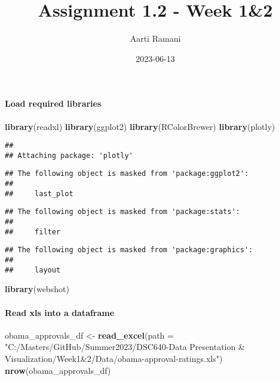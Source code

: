 \documentclass[
]{article}
\title{Assignment 1.2 - Week 1\&2}
\author{Aarti Ramani}
\date{2023-06-13}
\newenvironment{Shaded}{\begin{snugshade}}{\end{snugshade}}
\newcommand{\AttributeTok}[1]{\textcolor[rgb]{0.13,0.29,0.53}{#1}}
\newcommand{\FunctionTok}[1]{\textcolor[rgb]{0.13,0.29,0.53}{\textbf{#1}}}
\newcommand{\NormalTok}[1]{#1}
\newcommand{\OtherTok}[1]{\textcolor[rgb]{0.56,0.35,0.01}{#1}}
\newcommand{\StringTok}[1]{\textcolor[rgb]{0.31,0.60,0.02}{#1}}
\begin{document}
\maketitle

\hypertarget{load-required-libraries}{%
\paragraph{Load required libraries}\label{load-required-libraries}}

\begin{Shaded}
\begin{Highlighting}[]
\FunctionTok{library}\NormalTok{(readxl)}
\FunctionTok{library}\NormalTok{(ggplot2)}
\FunctionTok{library}\NormalTok{(RColorBrewer)   }
\FunctionTok{library}\NormalTok{(plotly)}
\end{Highlighting}
\end{Shaded}

\begin{verbatim}
## 
## Attaching package: 'plotly'
\end{verbatim}

\begin{verbatim}
## The following object is masked from 'package:ggplot2':
## 
##     last_plot
\end{verbatim}

\begin{verbatim}
## The following object is masked from 'package:stats':
## 
##     filter
\end{verbatim}

\begin{verbatim}
## The following object is masked from 'package:graphics':
## 
##     layout
\end{verbatim}

\begin{Shaded}
\begin{Highlighting}[]
\FunctionTok{library}\NormalTok{(webshot)}
\end{Highlighting}
\end{Shaded}

\hypertarget{read-xls-into-a-dataframe}{%
\paragraph{Read xls into a dataframe}\label{read-xls-into-a-dataframe}}

\begin{Shaded}
\begin{Highlighting}[]
\NormalTok{obama\_approvals\_df }\OtherTok{\textless{}{-}} \FunctionTok{read\_excel}\NormalTok{(}\AttributeTok{path =} \StringTok{"C:/Masters/GitHub/Summer2023/DSC640{-}Data Presentation \& Visualization/Week1\&2/Data/obama{-}approval{-}ratings.xls"}\NormalTok{)}
\FunctionTok{nrow}\NormalTok{(obama\_approvals\_df)}
\end{Highlighting}
\end{Shaded}
\end{document}
